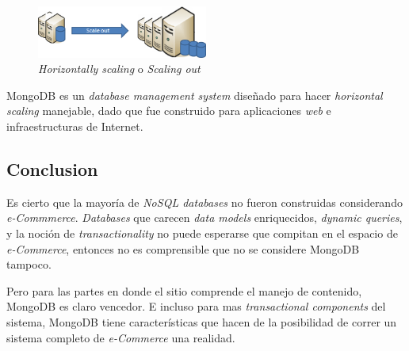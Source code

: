 \begin{figure}[h!]
	\centering
	\includegraphics[width=0.5\textwidth]{figuras/cap2/scale_out.png}
	\caption{\textit{Horizontally scaling} o \textit{Scaling out} }
\end{figure}

MongoDB es un \textit{database management system} diseñado para hacer \textit{horizontal scaling} manejable, dado que fue construido para aplicaciones \textit{web} e infraestructuras de Internet.

\subsection{Conclusion}

Es cierto que la mayoría de \textit{NoSQL databases} no fueron construidas considerando \textit{e-Commmerce}. \textit{Databases} que carecen \textit{data models} enriquecidos, \textit{dynamic queries}, y la noción de \textit{transactionality} no puede esperarse que compitan en el espacio de \textit{e-Commerce}, entonces no es comprensible que no se considere MongoDB tampoco.

Pero para las partes en donde el sitio \textit{} comprende el manejo de contenido, MongoDB es claro vencedor. E incluso para mas \textit{transactional components} del sistema, MongoDB tiene características que hacen de la posibilidad de correr un sistema completo de \textit{e-Commerce} una realidad.